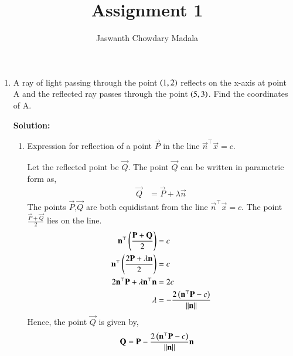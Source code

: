 \documentclass[journal,12pt,twocolumn]{IEEEtran}
\begin{document}
\vspace{3cm}


\title{Assignment 1}
\author{Jaswanth Chowdary Madala}





\maketitle

\newpage


\bigskip

\renewcommand{\thefigure}{\theenumi}
\renewcommand{\thetable}{\theenumi}

\begin{enumerate}
\item A ray of light passing through the point $\left(1, 2\right)$ reflects on the x-axis at point A and the reflected ray passes through the point $\left(5, 3\right)$. Find the coordinates of A.

\textbf{Solution:} 

\begin{enumerate}
\item Expression for reflection of a point $\vec{P}$ in the line $\vec{n}^{\top}\vec{x} = c$.

Let the reflected point be $\vec{Q}$. The point $\vec{Q}$ can be written in parametric form as,
\begin{align}
\vec{Q} &= \vec{P} + \lambda\vec{n}
\end{align}
The points $\vec{P}$,$\vec{Q}$ are both equidistant from the line $\vec{n}^{\top}\vec{x} = c$. The point $\frac{\vec{P}+\vec{Q}}{2}$ lies on the line.
\begin{align}
\mathbf{n}^{\top}\left(\frac{\mathbf{P}+\mathbf{Q}}{2}\right) &= c\\
\mathbf{n}^{\top}\left(\frac{2\mathbf{P}+\lambda\mathbf{n}}{2}\right) &= c\\
2\mathbf{n}^{\top}\mathbf{P}+\lambda\mathbf{n}^{\top}\mathbf{n} &= 2c\\
\lambda &= -\frac{2\left(\mathbf{n}^{\top}\mathbf{P}-c\right)}{\left\lVert\mathbf{n}\right\rVert}
\end{align}
Hence, the point $\vec{Q}$ is given by,
\begin{align}
\mathbf{Q} &= \mathbf{P} -\frac{2\left(\mathbf{n}^{\top}\mathbf{P}-c\right)}{\left\lVert\mathbf{n}\right\rVert}\mathbf{n}
\end{align}


\end{enumerate}
\end{enumerate}
\end{document}
